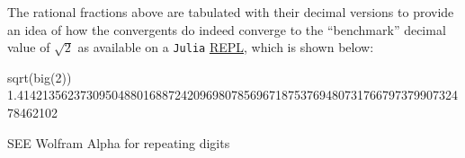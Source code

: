 \documentclass[
  a4paper,
]{article}
\newenvironment{Shaded}{\begin{snugshade}}{\end{snugshade}}
\newcommand{\FloatTok}[1]{\textcolor[rgb]{0.75,0.75,0.82}{#1}}
\newcommand{\FunctionTok}[1]{\textcolor[rgb]{0.94,0.94,0.56}{#1}}
\newcommand{\NormalTok}[1]{\textcolor[rgb]{0.80,0.80,0.80}{#1}}
\begin{document}
The rational fractions above are tabulated with their decimal versions
to provide an idea of how the convergents do indeed converge to the
``benchmark'' decimal value of \(\sqrt{2}\) as available on a
\texttt{Julia}
\href{https://en.wikipedia.org/wiki/Read\%E2\%80\%93eval\%E2\%80\%93print_loop}{REPL},
which is shown below:

\begin{Shaded}
\begin{Highlighting}[]
\FunctionTok{sqrt}\NormalTok{(}\FunctionTok{big}\NormalTok{(}\FloatTok{2}\NormalTok{))}
\FloatTok{1.414213562373095048801688724209698078569671875376948073176679737990732478462102}
\end{Highlighting}
\end{Shaded}

SEE Wolfram Alpha for repeating digits
\end{document}
